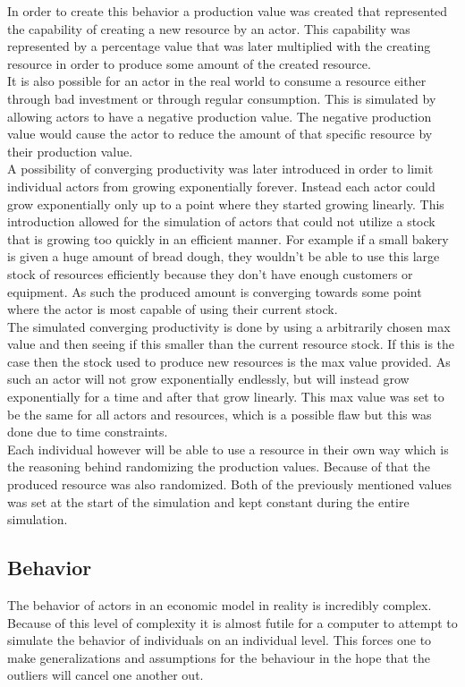 \documentclass[11p]{article}
\begin{document}
In order to create this behavior a production value was created that represented the capability of creating a new resource by an actor. This capability was represented by a percentage value that was later multiplied with the creating resource in order to produce some amount of the created resource.
\\

It is also possible for an actor in the real world to consume a resource either through bad investment or through regular consumption. This is simulated by allowing actors to have a negative production value. The negative production value would cause the actor to reduce the amount of that specific resource by their production value.
\\

A possibility of converging productivity was later introduced in order to limit individual actors from growing exponentially forever. Instead each actor could grow exponentially only up to a point where they started growing linearly. This introduction allowed for the simulation of actors that could not utilize a stock that is growing too quickly in an efficient manner. 
For example if a small bakery is given a huge amount of bread dough, they wouldn't be able to use this large stock of resources efficiently because they don't have enough customers or equipment. As such the produced amount is converging towards some point where the actor is most capable of using their current stock. 
\\

The simulated converging productivity is done by using a arbitrarily chosen max value and then seeing if this smaller than the current resource stock. If this is the case then the stock used to produce new resources is the max value provided. As such an actor will not grow exponentially endlessly, but will instead grow exponentially for a time and after that grow linearly. This max value was set to be the same for all actors and resources, which is a possible flaw but this was done due to time constraints.
\\

Each individual however will be able to use a resource in their own way which is the reasoning behind randomizing the production values. Because of that the produced resource was also randomized. Both of the previously mentioned values was set at the start of the simulation and kept constant during the entire simulation.
\subsection{Behavior}
The behavior of actors in an economic model in reality is incredibly complex. Because of this level of complexity it is almost futile for a computer to attempt to simulate the behavior of individuals on an individual level. This forces one to make generalizations and assumptions for the behaviour in the hope that the outliers will cancel one another out.
\\
\end{document}
